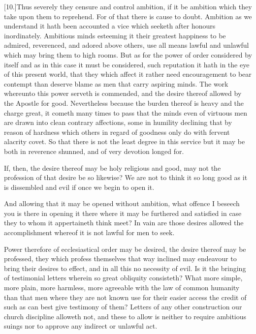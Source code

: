 [10.]Thus severely they censure and control ambition, if it be ambition which they take upon them to reprehend. For  of that there is cause to doubt.
 Ambition as we understand it hath been accounted a vice which seeketh after honours inordinately. Ambitious minds esteeming it their greatest happiness to be admired, reverenced, and adored above others, use all means lawful and unlawful which may bring them to high rooms. But as for the power of order considered by itself and as in this case it must be considered, such reputation it hath in the eye of this present world, that they which affect it rather need encouragement to bear contempt than deserve blame as men that carry aspiring minds. The work whereunto this power serveth is commended, and the desire thereof allowed by the Apostle for good. Nevertheless because the burden thereof is heavy and the charge great, it cometh many times to pass that the minds even of virtuous men are drawn into clean contrary affections, some in humility declining that by reason of hardness which others in regard of goodness only do with fervent alacrity covet. So that there is not the least degree in this service but it may be both in reverence shunned, and of very devotion longed for.

If, then, the desire thereof may be holy religious and good, may not the profession of that desire be so likewise? We are not to think it so long good as it is dissembled and evil if once we begin to open it.

And allowing that it may be opened without ambition, what offence I beseech you is there in opening it there where it may be furthered and satisfied in case they to whom it appertaineth think meet? In vain are those desires allowed the accomplishment whereof it is not lawful for men to seek.

Power therefore of ecclesiastical order may be desired, the desire thereof may be professed, they which profess themselves that way inclined may endeavour to bring their desires to effect, and in all this no necessity of evil. Is it the bringing of testimonial letters wherein so great obliquity consisteth?  What more simple,
 more plain, more harmless, more agreeable with the law of common humanity than that men where they are not known use for their easier access the credit of such as can best give testimony of them? Letters of any other construction our church discipline alloweth not, and these to allow is neither to require ambitious suings nor to approve any indirect or unlawful act.

